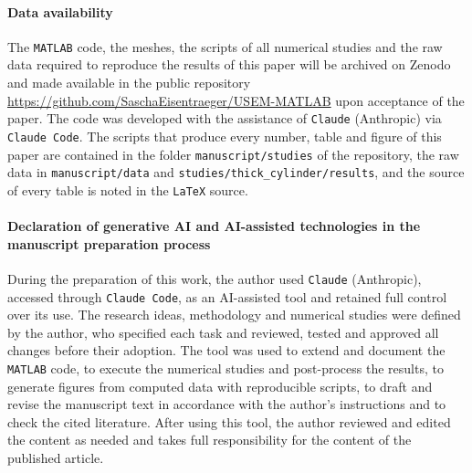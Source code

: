 \documentclass{article}
\begin{document}
\paragraph{Data availability} The \texttt{MATLAB} code, the meshes, the scripts of all numerical studies and the raw data required to reproduce the results of this paper will be archived on Zenodo and made available in the public repository \url{https://github.com/SaschaEisentraeger/USEM-MATLAB} upon acceptance of the paper. The code was developed with the assistance of \texttt{Claude} (Anthropic) via \texttt{Claude Code}. The scripts that produce every number, table and figure of this paper are contained in the folder \texttt{manuscript/studies} of the repository, the raw data in \texttt{manuscript/data} and \texttt{studies/thick\_cylinder/results}, and the source of every table is noted in the \texttt{LaTeX} source.
%
\paragraph{Declaration of generative AI and AI-assisted technologies in the manuscript preparation process} During the preparation of this work, the author used \texttt{Claude} (Anthropic), accessed through \texttt{Claude Code}, as an AI-assisted tool and retained full control over its use. The research ideas, methodology and numerical studies were defined by the author, who specified each task and reviewed, tested and approved all changes before their adoption. The tool was used to extend and document the \texttt{MATLAB} code, to execute the numerical studies and post-process the results, to generate figures from computed data with reproducible scripts, to draft and revise the manuscript text in accordance with the author's instructions and to check the cited literature. After using this tool, the author reviewed and edited the content as needed and takes full responsibility for the content of the published article.
%

%

{}

%
\end{document}

